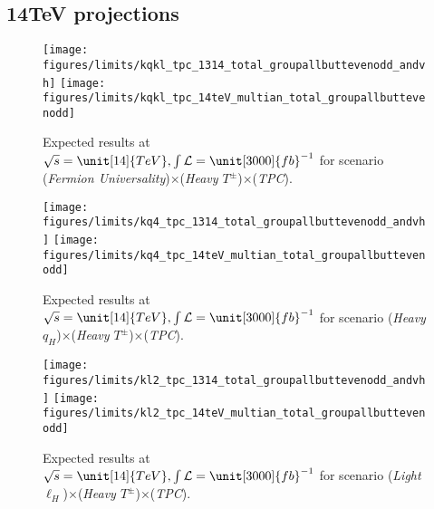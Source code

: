 \subsection{14TeV projections}
\begin{figure*}
\centering
\texttt{[image: figures/limits/kqkl\_tpc\_1314\_total\_groupallbuttevenodd\_andvh]} 
\texttt{[image: figures/limits/kqkl\_tpc\_14teV\_multian\_total\_groupallbuttevenodd]}
\caption{Expected results at $\sqrt{s}=\unit[14]{TeV}, \int \mathcal{L} = \unit[3000]{fb}^{-1}$ for scenario (\emph{Fermion Universality})$\times$(\emph{Heavy $T^\pm$})$\times$(\emph{TPC}). }
\label{fig:cmresults:14tev:samekqkl}
\texttt{[image: figures/limits/kq4\_tpc\_1314\_total\_groupallbuttevenodd\_andvh]} 
\texttt{[image: figures/limits/kq4\_tpc\_14teV\_multian\_total\_groupallbuttevenodd]}
\caption{Expected results at $\sqrt{s}=\unit[14]{TeV}, \int \mathcal{L} = \unit[3000]{fb}^{-1}$ for scenario (\emph{Heavy $q_H$})$\times$(\emph{Heavy $T^\pm$})$\times$(\emph{TPC}).}
\label{fig:cmresults:14tev:kq4}
\texttt{[image: figures/limits/kl2\_tpc\_1314\_total\_groupallbuttevenodd\_andvh]} 
\texttt{[image: figures/limits/kl2\_tpc\_14teV\_multian\_total\_groupallbuttevenodd]}
\caption{Expected results at $\sqrt{s}=\unit[14]{TeV}, \int \mathcal{L} = \unit[3000]{fb}^{-1}$ for scenario (\emph{Light $\ell_H$})$\times$(\emph{Heavy $T^\pm$})$\times$(\emph{TPC}).}
\label{fig:cmresults:14tev:kl2}
\end{figure*}

